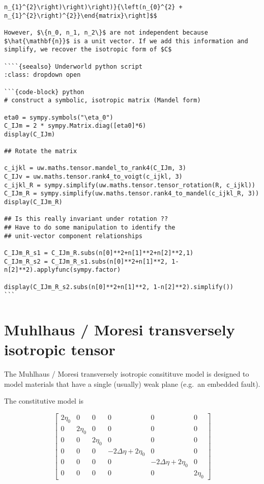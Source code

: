 \documentclass[
  letterpaper,
  DIV=11,
  numbers=noendperiod]{scrreprt}
\begin{document}
\begin{verbatim}
n_{1}^{2}\right)\right)\right)}{\left(n_{0}^{2} + n_{1}^{2}\right)^{2}}\end{matrix}\right]$$

However, $\{n_0, n_1, n_2\}$ are not independent because $\hat{\mathbf{n}}$ is a unit vector. If we add this information and simplify, we recover the isotropic form of $C$

````{seealso} Underworld python script
:class: dropdown open

```{code-block} python
# construct a symbolic, isotropic matrix (Mandel form)

eta0 = sympy.symbols("\eta_0")
C_IJm = 2 * sympy.Matrix.diag([eta0]*6)
display(C_IJm)

## Rotate the matrix 

c_ijkl = uw.maths.tensor.mandel_to_rank4(C_IJm, 3)
C_IJv = uw.maths.tensor.rank4_to_voigt(c_ijkl, 3)
c_ijkl_R = sympy.simplify(uw.maths.tensor.tensor_rotation(R, c_ijkl))
C_IJm_R = sympy.simplify(uw.maths.tensor.rank4_to_mandel(c_ijkl_R, 3))
display(C_IJm_R)

## Is this really invariant under rotation ?? 
## Have to do some manipulation to identify the 
## unit-vector component relationships

C_IJm_R_s1 = C_IJm_R.subs(n[0]**2+n[1]**2+n[2]**2,1)
C_IJm_R_s2 = C_IJm_R_s1.subs(n[0]**2+n[1]**2, 1-n[2]**2).applyfunc(sympy.factor)

display(C_IJm_R_s2.subs(n[0]**2+n[1]**2, 1-n[2]**2).simplify())
```
\end{verbatim}

\section{Muhlhaus / Moresi transversely isotropic
tensor}\label{muhlhaus-moresi-transversely-isotropic-tensor}

The Muhlhaus / Moresi transversely isotropic consitituve model is
designed to model materials that have a single (usually) weak plane
(e.g.~an embedded fault).

The constitutive model is

\[\left[\begin{matrix}2 \eta_{0} & 0 & 0 & 0 & 0 & 0\\0 & 2 \eta_{0} & 0 & 0 & 0 & 0\\0 & 0 & 2 \eta_{0} & 0 & 0 & 0\\0 & 0 & 0 & - 2 \Delta\eta + 2 \eta_{0} & 0 & 0\\0 & 0 & 0 & 0 & - 2 \Delta\eta + 2 \eta_{0} & 0\\0 & 0 & 0 & 0 & 0 & 2 \eta_{0}\end{matrix}\right]\]
\end{document}
